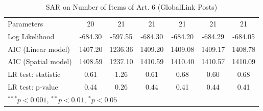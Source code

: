 \begin{table}[!h]
\begin{center}
\begin{tabular}{l c c c c c c }
Parameters              & 20           & 21            & 21           & 21           & 21           & 21           \\
Log Likelihood          & -684.30      & -597.55       & -684.30      & -684.20      & -684.29      & -684.05      \\
AIC (Linear model)      & 1407.20      & 1236.36       & 1409.20      & 1409.08      & 1409.17      & 1408.78      \\
AIC (Spatial model)     & 1408.59      & 1237.10       & 1410.59      & 1410.40      & 1410.57      & 1410.09      \\
LR test: statistic      & 0.61         & 1.26          & 0.61         & 0.68         & 0.60         & 0.68         \\
LR test: p-value        & 0.44         & 0.26          & 0.44         & 0.41         & 0.44         & 0.41         \\
\bottomrule
\multicolumn{7}{l}{\scriptsize{$^{***}p<0.001$, $^{**}p<0.01$, $^*p<0.05$}}
\end{tabular}
\caption{SAR on Number of Items of Art. 6 (GlobalLink Posts)}
\label{table:coefficients}
\end{center}
\end{table}
